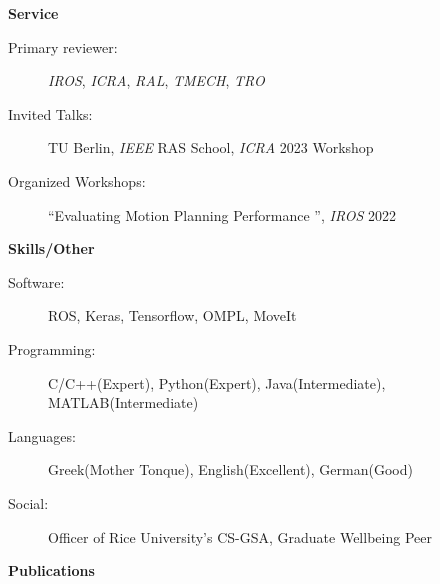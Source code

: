 \documentclass[letterpaper,11pt]{article}
\newcommand{\resheading}[1]{{\large \colorbox{mygrey}{\begin{minipage}{\textwidth}{\textbf{#1 \vphantom{p\^{E}}}}\end{minipage}}}}
\begin{document}
\resheading{Service}
\begin{description}
	\item[Primary reviewer:] \textit{IROS}, \textit{ICRA}, \textit{RAL}, \textit{TMECH}, \textit{TRO}
	\item[Invited Talks:] TU Berlin, \textit{IEEE} RAS School, \textit{ICRA} 2023 Workshop 
	\item[Organized Workshops:] ``Evaluating Motion Planning Performance '', \textit{IROS} 2022
\end{description}

\resheading{Skills/Other}
\begin{description}
    \item[Software:] ROS, Keras, Tensorflow, OMPL, MoveIt 
    \item[Programming:] C/C++(Expert), Python(Expert), Java(Intermediate), MATLAB(Intermediate) 
    \item[Languages:] Greek(Mother Tonque), English(Excellent), German(Good) 
    \item[Social:] Officer of Rice University's CS-GSA, Graduate Wellbeing Peer
\end{description}
\resheading{Publications }
\begingroup
	\renewcommand{\section}[2]{}%
\end{document}
